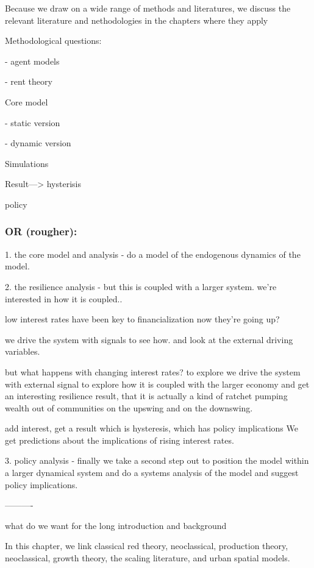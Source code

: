 \color{red}
Because we draw on a wide range of methods and literatures, we discuss the relevant literature and  nethodologies in the chapters where they apply 

\color{black}


Methodological questions: 

    - agent models 
    
    - rent theory

Core model

    - static version
    
    - dynamic version

Simulations

Result---> hysterisis

policy

\subsubsection{OR (rougher):}

1. the core model and analysis - do a model of the endogenous dynamics of the model.

2. the resilience analysis -
but this is coupled with a larger system. we're interested in how it is coupled..

low interest rates have been key to financialization 
now they're going up?

we drive the system with signals to see how. and look at the external driving variables.

but what happens with changing interest rates? to explore we drive the system with external signal to explore how it is coupled with the larger economy and get an interesting resilience result, that it is actually a kind of ratchet pumping wealth out of communities on the upswing and on the downswing.

add interest, get a result which is hysteresis, which has policy implications
We get predictions about the implications of rising interest rates.

3.  policy analysis - finally we take a second step out to position the model within a larger dynamical system and do a systems analysis of the model and suggest policy implications. 

----------

what do we want for the long introduction and background


\color{red}
In this chapter, we link classical red theory, neoclassical, production theory, neoclassical, growth theory, the scaling literature,  and urban spatial models. 

